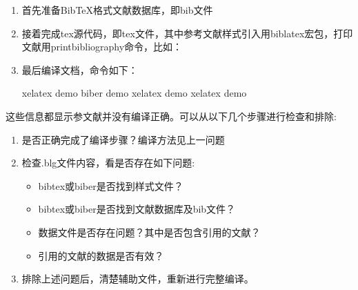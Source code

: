 \begin{enumerate}
\item 首先准备BibTeX格式文献数据库，即bib文件

\item 接着完成tex源代码，即tex文件，其中参考文献样式引入用biblatex宏包，打印文献用printbibliography命令，比如：


\item 最后编译文档，命令如下：

\begin{texinlist}
xelatex demo
biber demo
xelatex demo
xelatex demo
\end{texinlist}

\end{enumerate}



这些信息都显示参文献并没有编译正确。可以从以下几个步骤进行检查和排除:
\begin{enumerate}
\item 是否正确完成了编译步骤？编译方法见上一问题

\item 检查.blg文件内容，看是否存在如下问题:

\begin{itemize}
  \item bibtex或biber是否找到样式文件？
  \item bibtex或biber是否找到文献数据库及bib文件？
  \item 数据文件是否存在问题？其中是否包含引用的文献？
  \item 引用的文献的数据是否有效？
\end{itemize}

\item 排除上述问题后，清楚辅助文件，重新进行完整编译。

\end{enumerate}



